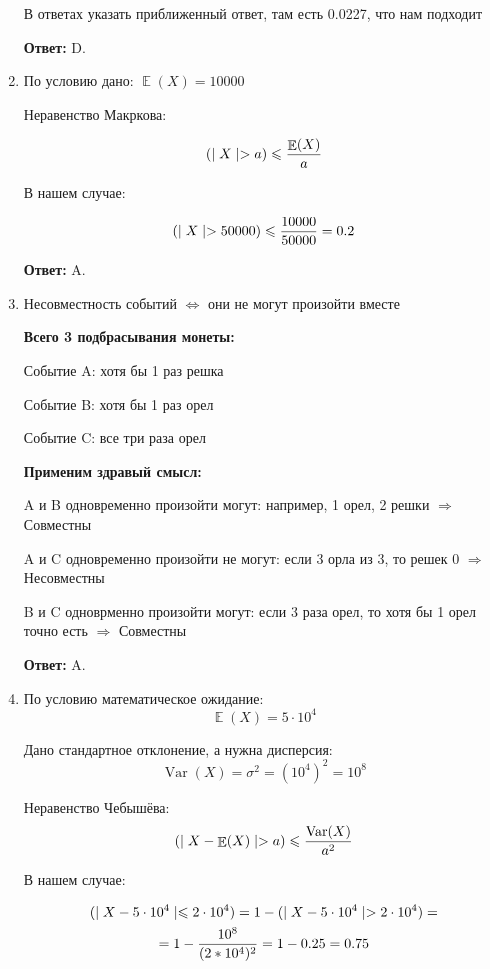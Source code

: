 \documentclass[a4paper]{article} %
\DeclareMathOperator{\Var}{Var}
\DeclareMathOperator{\E}{\mathbb{E}}
\let\P\relax
\DeclareMathOperator{\P}{\mathbb{P}}
\renewcommand{\leq}{\leqslant}
\begin{document}
\begin{enumerate}
    В ответах указать приближенный ответ, там есть 0.0227, что нам подходит
    
    \textbf{Ответ:} D.
    
    
    \item
    По условию дано: $\E(X) = 10000$
    
    Неравенство Макркова:
    
    \[ \P(\mid X \mid > a) \leq \frac{\E(X)}{a} \]
    
    В нашем случае:
    
    \[ \P(\mid X \mid > 50000) \leq \frac{10000}{50000} = 0.2 \]
    
    \textbf{Ответ:} A.
    
    
    \item
    Несовместность событий $\Leftrightarrow$ они не могут произойти вместе
    
    \textbf{Всего 3 подбрасывания монеты:}
    
    Событие A: хотя бы 1 раз решка

    Событие B: хотя бы 1 раз орел

    Событие C: все три раза орел
    
    \textbf{Применим здравый смысл:}
    
    A и B одновременно произойти могут: например, 1 орел, 2 решки $\Rightarrow$ Совместны
    
    A и C одновременно произойти не могут: если 3 орла из 3, то решек 0 $\Rightarrow$ Несовместны
    
    B и C одноврменно произойти могут: если 3 раза орел, то хотя бы 1 орел точно есть $\Rightarrow$ Совместны
    
    \textbf{Ответ:} A.
    
    
    \item
    По условию математическое ожидание:
    \[\E(X) = 5\cdot10^4\]
    
    Дано стандартное отклонение, а нужна дисперсия:
    \[ \Var(X) = \sigma^2 = (10^4)^2 = 10^8 \]
    
    Неравенство Чебышёва:
    \[ \P(\mid X - \E(X) \mid > a) \leq \frac{\Var(X)}{a^2}\]
    
    В нашем случае:
    
    \[ \begin{gathered} \P(\mid X - 5\cdot10^4 \mid \leq 2\cdot10^4) = 1 -  \P(\mid X - 5\cdot10^4 \mid > 2\cdot10^4) = \\
    =1 - \frac{10^8}{(2* 10^4)^2} = 1 - 0.25 = 0.75 \end{gathered}\]
    

\end{enumerate}
\end{document}
